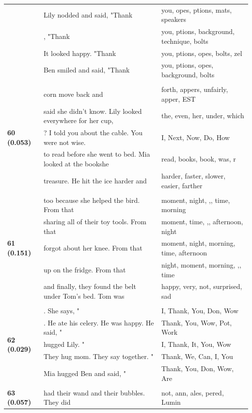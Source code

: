 \documentclass{article}
\theoremstyle{plain}
\theoremstyle{definition}
\theoremstyle{remark}
\begin{document}
\begin{longtable}{|p{}|p{}|p{}|}
& Lily nodded and said, "Thank & you, opes, ptions,  mats,  speakers \\
& , "Thank & you, ptions,  background,  technique,  bolts \\
& It looked happy.  "Thank & you, ptions, opes,  bolts, zel \\
& Ben smiled and said, "Thank & you, ptions, opes,  background,  bolts \\
& & \\
\multirow{5}{*}{\textbf{60 (0.053)}} & corn move back and & forth, appers,  unfairly, apper, EST \\
& said she didn't know.  Lily looked everywhere for her cup, & the,  even,  her,  under,  which \\
& ? I told you about the cable. You were not wise. & I,  Next,  Now,  Do,  How \\
& to read before she went to bed. Mia looked at the bookshe & read,  books,  book,  was, r \\
& treasure. He hit the ice harder and & harder,  faster,  slower,  easier,  farther \\
& & \\
\multirow{5}{*}{\textbf{61 (0.151)}} & too because she helped the bird. From that & moment,  night, ,,  time,  morning \\
& sharing all of their toy tools. From that & moment,  time, ,,  afternoon,  night \\
& forgot about her knee. From that & moment,  night,  morning,  time,  afternoon \\
& up on the fridge. From that & night,  moment,  morning, ,,  time \\
& and finally, they found the belt under Tom's bed. Tom was & happy,  very,  not,  surprised,  sad \\
& & \\
\multirow{5}{*}{\textbf{62 (0.029)}} & . She says, " & I, Thank, You, Don, Wow \\
& . He ate his celery. He was happy. He said, " & Thank, You, Wow, Pot, Work \\
& hugged Lily.  " & I, Thank, It, You, Wow \\
& They hug mom. They say together.  " & Thank, We, Can, I, You \\
& Mia hugged Ben and said, " & Thank, You, Don, Wow, Are \\
& & \\
\multirow{5}{*}{\textbf{63 (0.057)}} & had their wand and their bubbles. They did & not, ann, ales, pered,  Lumin \\

\end{longtable}
\end{document}
